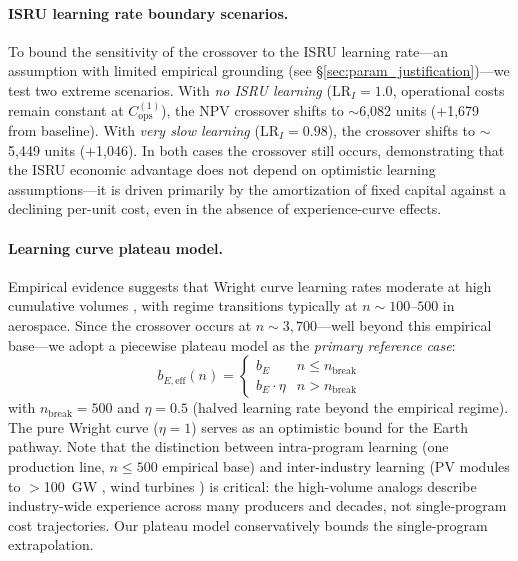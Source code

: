 \documentclass[preprint,12pt]{elsarticle}
\begin{document}
\paragraph{ISRU learning rate boundary scenarios.} To bound the sensitivity of the crossover to the ISRU learning rate---an assumption with limited empirical grounding (see \S\ref{sec:param_justification})---we test two extreme scenarios. With \emph{no ISRU learning} ($\mathrm{LR}_I = 1.0$, operational costs remain constant at $C_{\mathrm{ops}}^{(1)}$), the NPV crossover shifts to $\sim$6{,}082 units ($+$1{,}679 from baseline). With \emph{very slow learning} ($\mathrm{LR}_I = 0.98$), the crossover shifts to $\sim$5{,}449 units ($+$1{,}046). In both cases the crossover still occurs, demonstrating that the ISRU economic advantage does not depend on optimistic learning assumptions---it is driven primarily by the amortization of fixed capital against a declining per-unit cost, even in the absence of experience-curve effects.

\paragraph{Learning curve plateau model.} Empirical evidence suggests that Wright curve learning rates moderate at high cumulative volumes \cite{argote1990,thompson2012,benkard2000}, with regime transitions typically at $n \sim 100$--$500$ in aerospace. Since the crossover occurs at $n \sim 3{,}700$---well beyond this empirical base---we adopt a piecewise plateau model as the \emph{primary reference case}:
\begin{equation}
  b_{E,\mathrm{eff}}(n) = \begin{cases} b_E & n \leq n_{\mathrm{break}} \\ b_E \cdot \eta & n > n_{\mathrm{break}} \end{cases}
\end{equation}
with $n_{\mathrm{break}} = 500$ and $\eta = 0.5$ (halved learning rate beyond the empirical regime). The pure Wright curve ($\eta = 1$) serves as an optimistic bound for the Earth pathway. Note that the distinction between intra-program learning (one production line, $n \leq 500$ empirical base) and inter-industry learning (PV modules to $>$100~GW \cite{kavlak2018}, wind turbines \cite{rubin2015}) is critical: the high-volume analogs describe industry-wide experience across many producers and decades, not single-program cost trajectories. Our plateau model conservatively bounds the single-program extrapolation.
\end{document}
